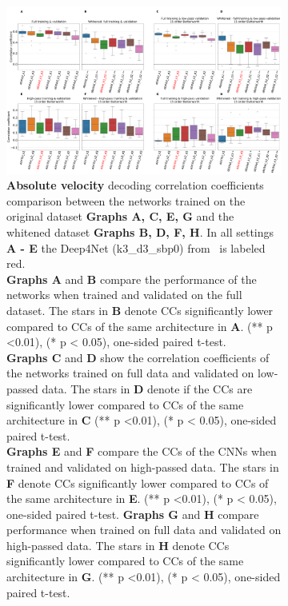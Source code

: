 \begin{figure}[!hpbp]
\begin{subfigure}[b]{\textwidth}
   \includegraphics[width=1\linewidth]{img/ch4/absVel-pw-vs-non-pw-performance}
   \caption{\textbf{Absolute velocity} decoding correlation coefficients comparison between the networks trained on the original dataset \textbf{Graphs A, C, E, G} and the whitened dataset \textbf{Graphs B, D, F, H}.
   In all settings \textbf{A - E} the Deep4Net (k3\_d3\_sbp0) from~\cite{Hammer-2021} is labeled red.
   \\ \textbf{Graphs A} and \textbf{B} compare the performance of the networks when trained and validated on the full dataset.
   The stars in \textbf{B} denote CCs significantly lower compared to CCs of the same architecture in \textbf{A}. (** p <0.01), (* p < 0.05), one-sided paired t-test.
   \\\textbf{Graphs C} and \textbf{D} show the correlation coefficients of the networks trained on full data and validated on low-passed data.
   The stars in \textbf{D} denote if the CCs are significantly lower compared to CCs of the same architecture in \textbf{C} (** p <0.01), (* p < 0.05), one-sided paired t-test.
   \\\textbf{Graphs E} and \textbf{F} compare the CCs of the CNNs when trained and validated on high-passed data.
   The stars in \textbf{F} denote CCs significantly lower compared to CCs of the same architecture in \textbf{E}. (** p <0.01), (* p < 0.05), one-sided paired t-test.
   \textbf{Graphs G} and \textbf{H} compare performance when trained on full data and validated on high-passed data.
   The stars in \textbf{H} denote CCs significantly lower compared to CCs of the same architecture in \textbf{G}. (** p <0.01), (* p < 0.05), one-sided paired t-test.}
\end{subfigure}\label{fig:absVel-pw-performance}
\caption[Comparion of CCs between CNNs trained on the original and whitened signal]{}
\end{figure}\label{fig:pw-performance}

